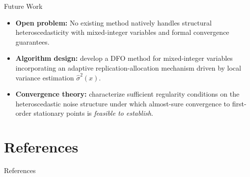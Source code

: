 \documentclass[xcolor=svgnames]{beamer}
\begin{document}
\begin{frame}{Future Work}
	\begin{itemize}[<+->]
		\justifying
		\item \textbf{Open problem:} No existing method natively handles structural heteroscedasticity with mixed-integer variables
		and formal convergence guarantees.
		\item \textbf{Algorithm design:} develop a DFO method for mixed-integer variables incorporating an adaptive replication-allocation mechanism driven by local variance estimation $\hat{\sigma}^2(x)$.
		\item \textbf{Convergence theory:} characterize sufficient regularity
		conditions on the heteroscedastic noise structure under which
		almost-sure convergence to first-order stationary points
		is \emph{feasible to establish}.
	\end{itemize}
\end{frame}


\lastrealframe
\usebackgroundtemplate{}
\begin{frame}[plain]
	\titlepage
	\addbuild
	\addtocounter{framenumber}{-1}
\end{frame}


\section{References}
\begin{frame}[allowframebreaks]{References}
	\tiny
	
	
\end{frame}

\appendix
\end{document}
